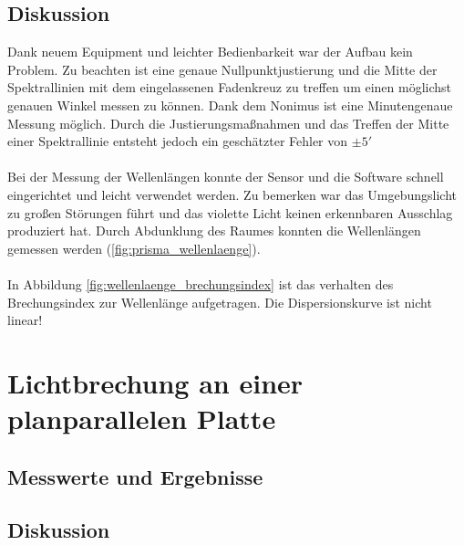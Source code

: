 \documentclass[12pt,a4paper]{article}
\begin{document}
\begin{multicols}{2}

\subsection{Diskussion}
Dank neuem Equipment und leichter Bedienbarkeit war der Aufbau kein Problem. Zu beachten ist eine genaue Nullpunktjustierung und die Mitte der Spektrallinien mit dem eingelassenen Fadenkreuz zu treffen um einen möglichst genauen Winkel messen zu können. Dank dem Nonimus ist eine Minutengenaue Messung möglich. Durch die Justierungsmaßnahmen und das Treffen der Mitte einer Spektrallinie entsteht jedoch ein geschätzter Fehler von $\pm 5'$\\
\\
Bei der Messung der Wellenlängen konnte der Sensor und die Software schnell eingerichtet und leicht verwendet werden. Zu bemerken war das Umgebungslicht zu großen Störungen führt und das violette Licht keinen erkennbaren Ausschlag produziert hat. Durch Abdunklung des Raumes konnten die Wellenlängen gemessen werden (\ref{fig:prisma_wellenlaenge}).\\
\\
In Abbildung \ref{fig:wellenlaenge_brechungsindex} ist das verhalten des Brechungsindex zur Wellenlänge aufgetragen. Die Dispersionskurve ist nicht linear!

\section{Lichtbrechung an einer planparallelen Platte}

\subsection{Messwerte und Ergebnisse}


\subsection{Diskussion}



\end{multicols}
\end{document}
